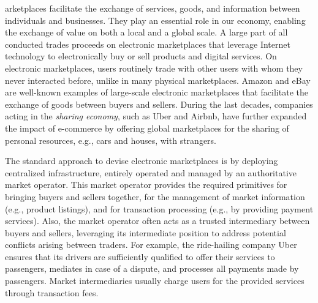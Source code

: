 arketplaces facilitate the exchange of services, goods, and information between individuals and businesses.
They play an essential role in our economy, enabling the exchange of value on both a local and a global scale.
A large part of all conducted trades proceeds on electronic marketplaces that leverage Internet technology to electronically buy or sell products and digital services.
On electronic marketplaces, users routinely trade with other users with whom they never interacted before, unlike in many physical marketplaces.
Amazon and eBay are well-known examples of large-scale electronic marketplaces that facilitate the exchange of goods between buyers and sellers.
During the last decades, companies acting in the \emph{sharing economy}, such as Uber and Airbnb, have further expanded the impact of e-commerce by offering global marketplaces for the sharing of personal resources, e.g., cars and houses, with strangers.


The standard approach to devise electronic marketplaces is by deploying centralized infrastructure, entirely operated and managed by an authoritative market operator.
This market operator provides the required primitives for bringing buyers and sellers together, for the management of market information (e.g., product listings), and for transaction processing (e.g., by providing payment services).
Also, the market operator often acts as a trusted intermediary between buyers and sellers, leveraging its intermediate position to address potential conflicts arising between traders.
For example, the ride-hailing company Uber ensures that its drivers are sufficiently qualified to offer their services to passengers, mediates in case of a dispute, and processes all payments made by passengers.
Market intermediaries usually charge users for the provided services through transaction fees.

